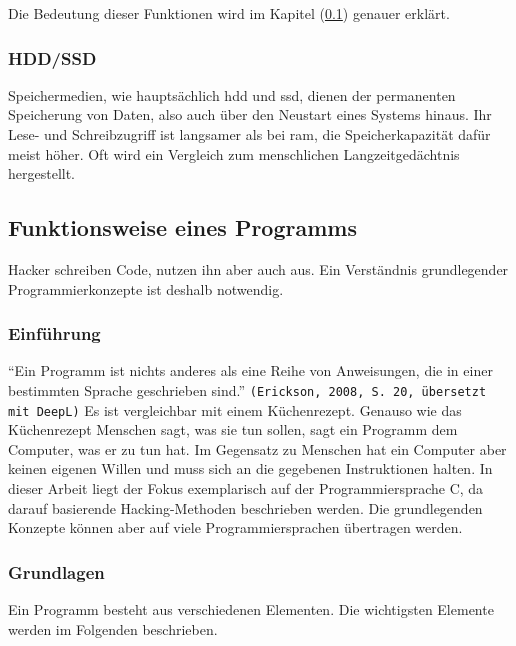 \documentclass[11pt, a4paper]{article}
\begin{document}
Die Bedeutung dieser Funktionen wird im Kapitel  (\ref{subsec:funktionsweise-eines-programmes}) genauer erklärt.

\subsubsection{HDD/SSD}
Speichermedien, wie hauptsächlich \gls{hdd} und \gls{ssd}, dienen der permanenten Speicherung von Daten, also auch über den Neustart eines Systems hinaus. Ihr Lese- und Schreibzugriff ist langsamer als bei \gls{ram}, die Speicherkapazität dafür meist höher. Oft wird ein Vergleich zum menschlichen Langzeitgedächtnis hergestellt. 

\subsection{Funktionsweise eines Programms}\label{subsec:funktionsweise-eines-programmes}
Hacker schreiben Code, nutzen ihn aber auch aus. Ein Verständnis grundlegender Programmierkonzepte ist deshalb notwendig.
\subsubsection{Einführung}
``Ein Programm ist nichts anderes als eine Reihe von Anweisungen, die in einer bestimmten Sprache geschrieben sind.'' \texttt{(Erickson, 2008, S. 20, übersetzt mit DeepL)} \cite{erickson2008hacking} Es ist vergleichbar mit einem Küchenrezept. Genauso wie das Küchenrezept Menschen sagt, was sie tun sollen, sagt ein Programm dem Computer, was er zu tun hat. Im Gegensatz zu Menschen hat ein Computer aber keinen eigenen Willen und muss sich an die gegebenen Instruktionen halten. In dieser Arbeit liegt der Fokus exemplarisch auf der Programmiersprache C, da darauf basierende Hacking-Methoden beschrieben werden. Die grundlegenden Konzepte können aber auf viele Programmiersprachen übertragen werden.
\subsubsection{Grundlagen}
Ein Programm besteht aus verschiedenen Elementen. Die wichtigsten Elemente werden im Folgenden beschrieben.
\end{document}

